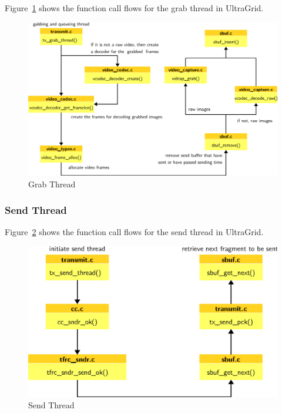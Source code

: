 Figure~\ref{fig:ultra-grab} shows the function call flows for the grab thread in
UltraGrid.

\begin{figure}[!h]
\begin{center}
\includegraphics[scale=.5]{./img/ultra-grab}
\caption{\label{fig:ultra-grab}Grab Thread}
\end{center}
\end{figure}

\subsubsection{\label{sssec:ultra-grab}Send Thread} 

Figure~\ref{fig:ultra-send} shows the function call flows for the send thread in
UltraGrid.

\begin{figure}[!h]
\begin{center}
\includegraphics[scale=.5]{./img/ultra-send}
\caption{\label{fig:ultra-send}Send Thread}
\end{center}
\end{figure}

\newpage

